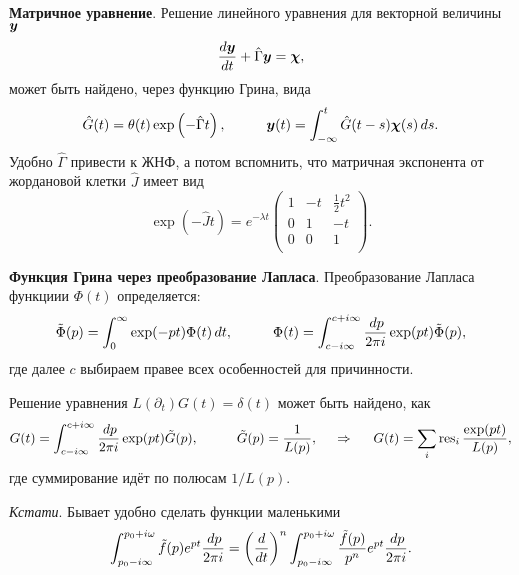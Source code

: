 \textbf{Матричное уравнение}. Решение линейного уравнения для векторной величины $\mbox{\boldmath $y$}$
\begin{equation*}
    \frac{d \mbox{\boldmath $y$}}{d t} + \hat{\Gamma} \mbox{\boldmath $y$} = \mbox{\boldmath $\chi$},
\end{equation*}
может быть найдено, через функцию Грина, вида
\begin{equation}
    \hat{G} (t) = \theta(t) \exp\left(- \hat{\Gamma} t\right),
    \hspace{10 mm} 
    \vc{y}(t) = \int_{-\infty}^{t}  \hat{G}(t-s) \vc{\chi}(s) \d s.
\end{equation}
Удобно $\hat{\Gamma}$ привести к ЖНФ, а потом вспомнить, что матричная экспонента от жордановой клетки $\hat{J}$ имеет вид
\begin{equation*}
    \exp\left(- \hat{J} t\right) = e^{- \lambda t}
    \left(
    \begin{array}{ccc}
     1 & -t & \frac{1}{2}t^2 \\
     0 & 1 & -t \\
     0 & 0 & 1 \\
    \end{array}
    \right).
\end{equation*}




\textbf{Функция Грина через преобразование Лапласа}. Преобразование Лапласа функциии $\Phi(t)$ определяется:
\begin{equation*}
    \tilde{\Phi}(p) = \int_{0}^{\infty}  \exp(-pt) \Phi(t) \d t,
    \hspace{10 mm} 
    \Phi(t) = \int_{c-i \infty}^{c+i \infty} \frac{\d p}{2 \pi i} \exp(pt) \tilde{\Phi}(p),
\end{equation*}
где далее $c$ выбираем правее всех особенностей для причинности. 

Решение уравнения $L(\partial_t) G(t) = \delta(t)$ может быть найдено, как
\begin{equation}
    G(t) = \int_{c-i \infty}^{c+i \infty} \frac{\d p}{2 \pi i} \exp(p t) \tilde{G}(p),
    \hspace{10 mm} \tilde{G} (p) = \frac{1}{L(p)},
    \hspace{0.5cm} \Rightarrow \hspace{0.5cm}
    G(t) = \sum_i \res_i \frac{\exp(pt)}{L(p)},
\end{equation}
где суммирование идёт по полюсам $1/L(p)$. 

\textit{Кстати}. Бывает удобно сделать функции маленькими
\begin{equation*}
    \int_{p_0 - i \infty}^{p_0 + i \omega} \tilde{f}(p) e^{pt} \frac{\, d p}{2 \pi i} = 
    \left(\frac{d }{d t} \right)^n \int_{p_0 - i \infty}^{p_0 + i \omega} \frac{\tilde{f}(p)}{p^n} e^{pt} \frac{\, d p}{2 \pi i}.
\end{equation*}







